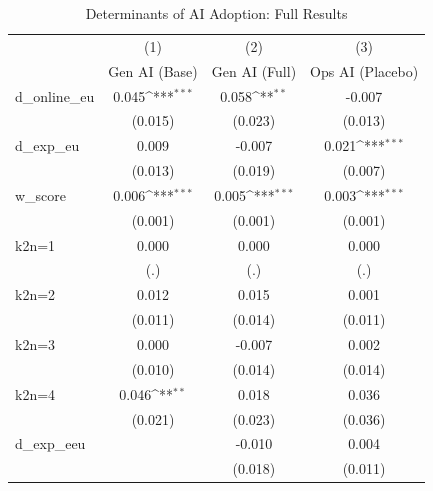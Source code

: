 \begin{table}[htbp]\centering
\def\sym#1{\ifmmode^{#1}\else\(^{#1}\)\fi}
\caption{Determinants of AI Adoption: Full Results}
\begin{tabular}{l*{3}{c}}
\toprule
                    &\multicolumn{1}{c}{(1)}&\multicolumn{1}{c}{(2)}&\multicolumn{1}{c}{(3)}\\
                    &\multicolumn{1}{c}{Gen AI (Base)}&\multicolumn{1}{c}{Gen AI (Full)}&\multicolumn{1}{c}{Ops AI (Placebo)}\\
\midrule
d\_online\_eu         &       0.045\sym{***}&       0.058\sym{**} &      -0.007         \\
                    &     (0.015)         &     (0.023)         &     (0.013)         \\
\addlinespace
d\_exp\_eu            &       0.009         &      -0.007         &       0.021\sym{***}\\
                    &     (0.013)         &     (0.019)         &     (0.007)         \\
\addlinespace
w\_score             &       0.006\sym{***}&       0.005\sym{***}&       0.003\sym{***}\\
                    &     (0.001)         &     (0.001)         &     (0.001)         \\
\addlinespace
k2n=1               &       0.000         &       0.000         &       0.000         \\
                    &         (.)         &         (.)         &         (.)         \\
\addlinespace
k2n=2               &       0.012         &       0.015         &       0.001         \\
                    &     (0.011)         &     (0.014)         &     (0.011)         \\
\addlinespace
k2n=3               &       0.000         &      -0.007         &       0.002         \\
                    &     (0.010)         &     (0.014)         &     (0.014)         \\
\addlinespace
k2n=4               &       0.046\sym{**} &       0.018         &       0.036         \\
                    &     (0.021)         &     (0.023)         &     (0.036)         \\
\addlinespace
d\_exp\_eeu           &                     &      -0.010         &       0.004         \\
                    &                     &     (0.018)         &     (0.011)         \\

\end{tabular}
\end{table}
